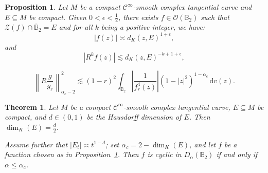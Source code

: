 \documentclass[10pt,a4paper]{amsart}
\newtheorem{thm}{Theorem}
\newtheorem{prop}{Proposition}
\def\B{\mathbb{B}}
\begin{document}
        \begin{prop} \label{MainTool2}
        Let $M$ be a compact $\mathcal{C}^\infty$-smooth complex tangential curve and $E \subseteq M $ be compact. Given $ 0 <\epsilon < \frac{1}{2}$, there exists $f \in \mathcal{O}(\B_2)$ such that $\mathcal{Z}(f) \cap \overline{\B}_2 = E$ and for all $ k$ being a positive integer, we have:
        \begin{equation} \label{eq: Maintool2 estimate1}
             |f(z)| \asymp d_K(z,E)^{1+\epsilon},
        \end{equation}
        and
        \begin{equation} \label{eq: Maintool2 estimate2}
            |R^{k} f(z)| \lesssim d_K(z,E)^{-k+1+\epsilon},
        \end{equation}
        \end{prop}

    \begin{equation} \label{eq:Rg/g_r estimate3}
        \left\| R \frac{g}{g_r} \right\|_{\alpha_c - 2}^2 \lesssim (1-r)^2 \int_{\B_2} \left| \frac{1}{f_r^4(z)}  \right| (1-|z|^2)^{1-\alpha_c}\, \mathrm{d}v(z).
    \end{equation}

        \begin{thm} \label{MainThm2}
        Let $M$ be a compact $\mathcal{C}^\infty$-smooth complex tangential curve, $E \subseteq M $ be compact,
and $d \in (0,1)$ be the Hausdorff dimension of $E$. 
Then $\dim_{K}(E) = \frac{d}{2}$.

Assume further that $|E_t|\asymp t^{1 - d}$; set
$\alpha_c = 2 - \dim_{K}(E)$, and let $f$ be a function
chosen as in Proposition~{\ref{MainTool2}}.
Then $f$ is cyclic in $D_\alpha(\B_2)$ if and only if $\alpha \leq \alpha_c$.
        \end{thm}
\end{document}
